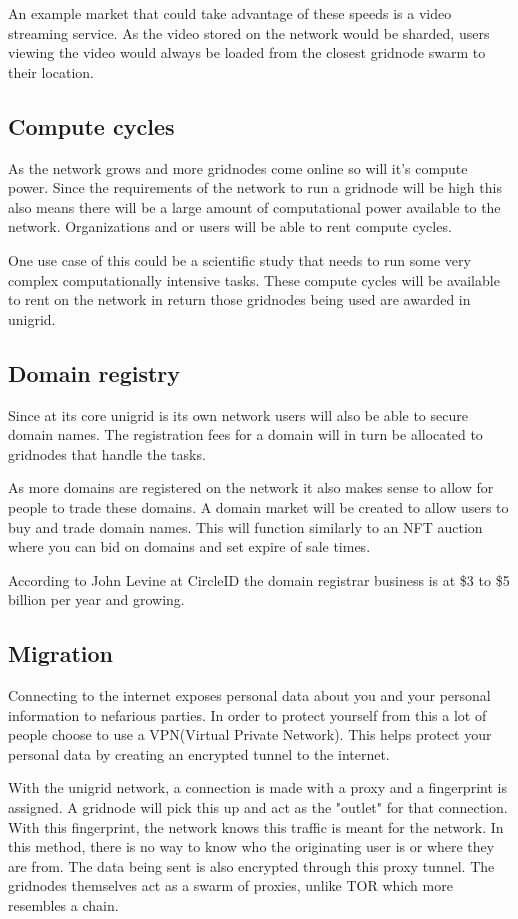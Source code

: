 \documentclass[12pt]{article}
\begin{document}
An example market that could take advantage of these speeds is a video streaming service. As the video stored on the network would be sharded, users viewing the video would always be loaded from the closest gridnode swarm to their location.
   

\subsection*{Compute cycles}
As the network grows and more gridnodes come online so will it's compute power. Since the requirements of the network to run a gridnode will be high this also means there will be a large amount of computational power available to the network. Organizations and or users will be able to rent compute cycles. 

One use case of this could be a scientific study that needs to run some very complex computationally intensive tasks. These compute cycles will be available to rent on the network in return those gridnodes being used are awarded in unigrid.

\subsection*{Domain registry}
Since at its core unigrid is its own network users will also be able to secure domain names. The registration fees for a domain will in turn be allocated to gridnodes that handle the tasks.

As more domains are registered on the network it also makes sense to allow for people to trade these domains. A domain market will be created to allow users to buy and trade domain names. This will function similarly to an NFT auction where you can bid on domains and set expire of sale times.

According to John Levine at CircleID \cite{john2018} the domain registrar business is at \$3 to \$5 billion per year and growing.


\subsection*{Migration }
Connecting to the internet exposes personal data about you and your personal information to nefarious parties. In order to protect yourself from this a lot of people choose to use a VPN(Virtual Private Network). This helps protect your personal data by creating an encrypted tunnel to the internet.

With the unigrid network, a connection is made with a proxy and a fingerprint is assigned. A gridnode will pick this up and act as the "outlet" for that connection. With this fingerprint, the network knows this traffic is meant for the network. In this method, there is no way to know who the originating user is or where they are from. The data being sent is also encrypted through this proxy tunnel. The gridnodes themselves act as a swarm of proxies, unlike TOR which more resembles a chain.
\end{document}
